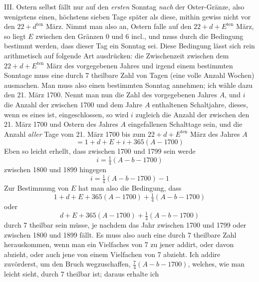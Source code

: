 %
III. Ostern selbst fällt nur auf den \textit{ersten} Sonntag \textit{nach} der Oster-Gränze,
also wenigstens einen, höchstens sieben Tage später als diese, mithin gewiss
nicht vor den $22+d^{\mathrm{ten}}$ März. Nimmt man also an, Ostern falle auf den
$22+d+E^{\mathrm{ten}}$ März, so liegt $E$ zwischen den Gränzen 0 und 6 incl., und muss
durch die Bedingung bestimmt werden, dass dieser Tag ein Sonntag sei. Diese
Bedingung lässt sich rein arithmetisch auf folgende Art ausdrücken: die Zwischenzeit
zwischen dem $22+d+E^{\mathrm{ten}}$ März des vorgegebenen Jahres und irgend
einem bestimmten Sonntage muss eine durch 7 theilbare Zahl von Tagen (eine
volle Anzahl Wochen) ausmachen. Man muss also einen bestimmten Sonntag
annehmen; ich wähle dazu den 21. März 1700. Nennt man nun die Zahl des
vorgegebenen Jahres $A$, und $i$ die Anzahl der zwischen 1700 und dem Jahre $A$
enthaltenen Schaltjahre, dieses, wenn es eines ist, eingeschlossen, so wird $i$ zugleich
die Anzahl der zwischen den 21. März 1700 und Ostern des Jahres $A$ eingefallenen
Schalttage sein, und die Anzahl \textit{aller} Tage vom 21. März 1700 bis
zum $22+d+E^{\mathrm{ten}}$ März des Jahres $A$
\[
=1+d+E+i+365(A-1700)
\]
Eben so leicht erhellt, dass zwischen 1700 und 1799 sein werde
\[
i=\tfrac14(A-b-1700)
\]
zwischen 1800 und 1899 hingegen
\[
i=\tfrac14(A-b-1700)-1
\]
Zur Bestimmung von $E$ hat man also die Bedingung, dass
\[
1+d+E+365(A-1700)+\tfrac14(A-b-1700)
\]
oder
\[
d+E+365(A-1700)+\tfrac14(A-b-1700)
\]
durch 7 theilbar sein müsse, je nachdem das Jahr zwischen 1700 und 1799 oder
zwischen 1800 und 1899 fällt. Es muss also auch eine durch 7 theilbare Zahl
herauskommen, wenn man ein Vielfaches von 7 zu jener addirt, oder davon abzieht,
oder auch jene von einem Vielfachen von 7 abzieht. Ich addire zuvörderst,
um den Bruch wegzuschaffen, $\frac74(A-b-1700)$, welches, wie man leicht
sieht, durch 7 theilbar ist; daraus erhalte ich
